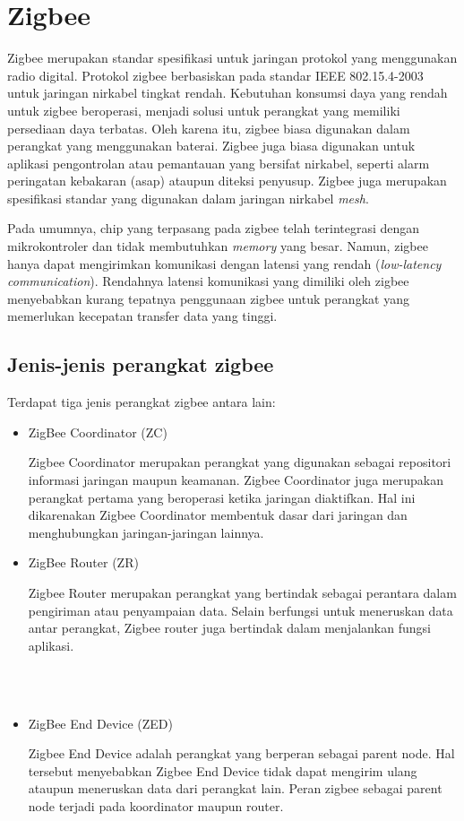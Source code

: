\section{Zigbee}
Zigbee merupakan standar spesifikasi untuk jaringan protokol yang menggunakan radio digital. Protokol zigbee berbasiskan pada standar IEEE 802.15.4-2003 untuk jaringan nirkabel tingkat rendah. Kebutuhan konsumsi daya yang rendah untuk zigbee beroperasi, menjadi solusi untuk perangkat yang memiliki persediaan daya terbatas. Oleh karena itu, zigbee biasa digunakan dalam perangkat yang menggunakan baterai. Zigbee juga biasa digunakan untuk aplikasi pengontrolan atau pemantauan yang bersifat nirkabel, seperti  alarm peringatan kebakaran (asap) ataupun diteksi penyusup. Zigbee juga merupakan spesifikasi standar yang digunakan dalam jaringan nirkabel \textit{mesh}.

Pada umumnya, chip yang terpasang pada zigbee telah terintegrasi dengan mikrokontroler dan tidak membutuhkan \textit{memory} yang besar. Namun, zigbee hanya dapat mengirimkan komunikasi dengan latensi yang rendah (\textit{low-latency communication}). Rendahnya latensi komunikasi yang dimiliki oleh zigbee menyebabkan kurang tepatnya penggunaan zigbee untuk perangkat yang memerlukan kecepatan transfer data yang tinggi.

\subsection{Jenis-jenis perangkat zigbee}
Terdapat tiga jenis perangkat zigbee antara lain:
\begin{itemize}
    \item ZigBee Coordinator (ZC)
    
    Zigbee Coordinator merupakan perangkat yang digunakan sebagai repositori informasi jaringan maupun keamanan. Zigbee Coordinator juga merupakan perangkat pertama yang beroperasi ketika jaringan diaktifkan. Hal ini dikarenakan Zigbee Coordinator membentuk dasar dari jaringan dan menghubungkan jaringan-jaringan lainnya.  
        
    \item ZigBee Router (ZR)
    
    Zigbee Router merupakan perangkat yang bertindak sebagai perantara dalam pengiriman atau penyampaian data. Selain berfungsi untuk meneruskan data antar perangkat, Zigbee router juga bertindak dalam menjalankan fungsi aplikasi. 
    
    \\~\\
    
    \item ZigBee End Device (ZED)
    
    Zigbee End Device adalah perangkat yang berperan sebagai parent node. Hal tersebut menyebabkan Zigbee End Device tidak dapat mengirim ulang ataupun meneruskan data dari perangkat lain. Peran zigbee sebagai parent node terjadi pada koordinator maupun router.
\end{itemize}


